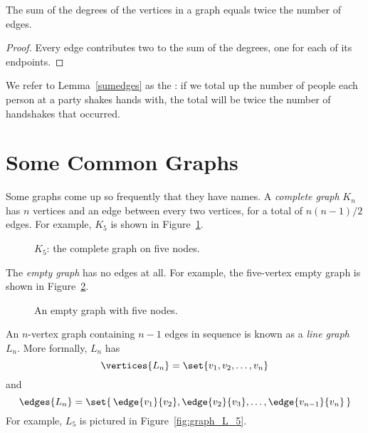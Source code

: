 \begin{lemma}\label{sumedges}
The sum of the degrees of the vertices in a graph equals twice the
number of edges.
\end{lemma}

\begin{proof}
Every edge contributes two to the sum of the degrees, one for each of its endpoints.
\end{proof}

We refer to Lemma~\ref{sumedges} as the : if
we total up the number of people each person at a party shakes hands
with, the total will be twice the number of handshakes that occurred.

\begin{problems}

\practiceproblems

\classproblems
{}

\examproblems
{}
\end{problems}

\section{Some Common Graphs}\label{sec:common_graphs}

Some graphs come up so frequently that they have names.  A
\emph{complete graph}%
$K_n$ has $n$ vertices and an edge between
every two vertices, for a total of $n(n-1)/2$ edges.  For example,
$K_5$ is shown in Figure~\ref{fig:K_5}.

\begin{figure}
\caption{$K_5$: the complete graph on five nodes.}
\label{fig:K_5}
\end{figure}

The \emph{empty graph}  has no edges
at all.  For example, the five-vertex empty graph is shown in
Figure~\ref{fig:graph_empty_5}.

\begin{figure}
\caption{An empty graph with five nodes.}
\label{fig:graph_empty_5}
\end{figure}

An $n$-vertex graph containing $n - 1$ edges in sequence is known as
a \emph{line graph}~$L_n$.  More formally, $L_n$ has
\begin{equation*}
    \vertices{L_n} = \set{ v_1, v_2, \dots, v_n }
\end{equation*}
and
\begin{equation*}
    \edges{L_n} = \set{\, \edge{v_1}{v_2}, \edge{v_2}{v_3}, \dots,
    \edge{v_{n-1}}{v_n} \, }
\end{equation*}
For example, $L_5$ is pictured in Figure~\ref{fig:graph_L_5}.

